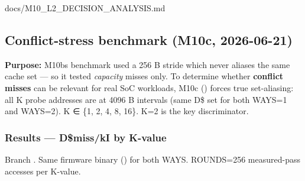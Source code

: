 \begin{relocated}{docs/M10_L2_DECISION_ANALYSIS.md}
\subsection{Conflict-stress benchmark (M10c, 2026-06-21)}\label{tm:dec:m10-l2:7-conflict-stress-benchmark-m10c-2026-06-21}

\textbf{Purpose:} M10b\textquotesingle s  benchmark used a
256 B stride which never aliases the same cache set --- so it tested
\emph{capacity} misses only. To determine whether \textbf{conflict
misses} can be relevant for real SoC workloads, M10c ()
forces true set-aliasing: all K probe addresses are at 4096 B intervals
(same D\$ set for both WAYS=1 and WAYS=2). K ∈ \{1, 2, 4, 8, 16\}. K=2
is the key discriminator.

\subsubsection{Results --- D\$miss/kI by K-value}\label{tm:dec:m10-l2:71-results-dmisski-by-k-value}

Branch . Same firmware binary
() for both WAYS. ROUNDS=256 measured-pass accesses
per K-value.


\end{relocated}

